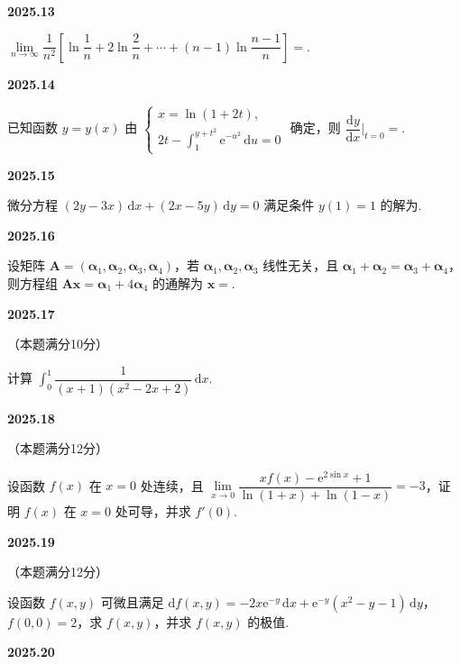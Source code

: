 \documentclass[UTF8,12pt,fontset=windows]{ctexart}
\begin{document}
\vfill
\newpage
{\large\bfseries 2025.13}

$\lim\limits_{n\to\infty}\dfrac{1}{n^2}\left[\ln\dfrac{1}{n}+2\ln\dfrac{2}{n}+\cdots+(n-1)\ln\dfrac{n-1}{n}\right]=$\underline{\hspace{20mm}}.

\vfill
\newpage
{\large\bfseries 2025.14}

已知函数 $y=y(x)$ 由 $\begin{cases}x=\ln(1+2t),\\[4pt]2t-\int_1^{y+t^2}\mathrm{e}^{-u^2}\,\mathrm{d}u=0\end{cases}$ 确定，则 $\dfrac{\mathrm{d}y}{\mathrm{d}x}\bigg|_{t=0}=$\underline{\hspace{20mm}}.

\vfill
\newpage
{\large\bfseries 2025.15}

微分方程 $(2y-3x)\,\mathrm{d}x+(2x-5y)\,\mathrm{d}y=0$ 满足条件 $y(1)=1$ 的解为\underline{\hspace{20mm}}.

\vfill
\newpage
{\large\bfseries 2025.16}

设矩阵 $\boldsymbol{A}=(\boldsymbol{\alpha}_1,\boldsymbol{\alpha}_2,\boldsymbol{\alpha}_3,\boldsymbol{\alpha}_4)$，若 $\boldsymbol{\alpha}_1,\boldsymbol{\alpha}_2,\boldsymbol{\alpha}_3$ 线性无关，且 $\boldsymbol{\alpha}_1+\boldsymbol{\alpha}_2=\boldsymbol{\alpha}_3+\boldsymbol{\alpha}_4$，则方程组 $\boldsymbol{Ax}=\boldsymbol{\alpha}_1+4\boldsymbol{\alpha}_4$ 的通解为 $\boldsymbol{x}=$\underline{\hspace{20mm}}.

\vfill
\newpage
{\large\bfseries 2025.17}

（本题满分10分）

计算 $\int_0^1\dfrac{1}{(x+1)(x^2-2x+2)}\,\mathrm{d}x$.

\vfill
\newpage
{\large\bfseries 2025.18}

（本题满分12分）

设函数 $f(x)$ 在 $x=0$ 处连续，且 $\lim\limits_{x\to0}\dfrac{xf(x)-\mathrm{e}^{2\sin x}+1}{\ln(1+x)+\ln(1-x)}=-3$，证明 $f(x)$ 在 $x=0$ 处可导，并求 $f'(0)$.

\vfill
\newpage
{\large\bfseries 2025.19}

（本题满分12分）

设函数 $f(x,y)$ 可微且满足 $\mathrm{d}f(x,y)=-2x\mathrm{e}^{-y}\,\mathrm{d}x+\mathrm{e}^{-y}(x^2-y-1)\,\mathrm{d}y$，$f(0,0)=2$，求 $f(x,y)$，并求 $f(x,y)$ 的极值.

\vfill
\newpage
{\large\bfseries 2025.20}
\end{document}
